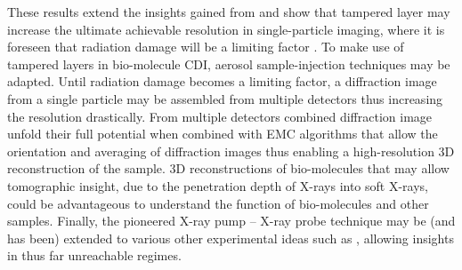 These results extend the insights gained from \citep{Hoener-2008-JPB} and show that tampered layer may increase the ultimate achievable resolution in single-particle imaging, where it is foreseen that radiation damage will be a limiting factor \citep{Aquila-2015-StrucDyn}. To make use of tampered layers in bio-molecule CDI, aerosol sample-injection techniques may be adapted. Until radiation damage becomes a limiting factor, a diffraction image from a single particle may be assembled from multiple detectors thus increasing the resolution drastically. From multiple detectors combined diffraction image unfold their full potential when combined with EMC algorithms \citep{Loh-2009-PRE} that allow the orientation and averaging of diffraction images thus enabling a high-resolution 3D reconstruction of the sample. 3D reconstructions of bio-molecules that may allow tomographic insight, due to the penetration depth of X-rays into soft X-rays, could be advantageous to understand the function of bio-molecules and other samples. Finally, the pioneered X-ray pump -- X-ray probe technique may be (and has been) extended to various other experimental ideas such as \citep{Picon-2016-NatComm,Kimberg-2016-FD,MacDonald-2016-RSI,Al-Haddad-2017-unpublished,Ferguson-2016-SciAdv}, allowing insights in thus far unreachable regimes.
%
%
%